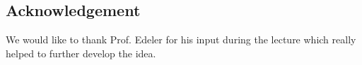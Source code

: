 \documentclass[notitlepage, a4paper, 11pt]{scrartcl}
\begin{document}
\begin{multicols}{2}
\section{Acknowledgement}

We would like to thank Prof. Edeler for his input during the lecture which really helped to further develop the idea.

\end{multicols}

 

\end{document}
